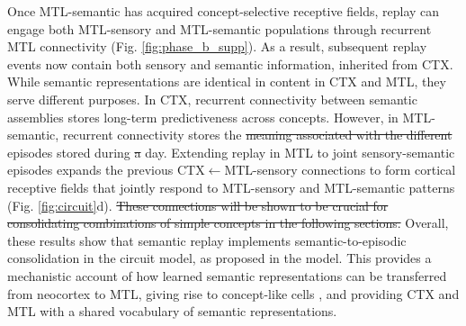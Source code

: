 \documentclass{article}
\providecommand{\DIFaddtex}[1]{{\protect\color{blue}\uwave{#1}}} %
\providecommand{\DIFdeltex}[1]{{\protect\color{red}\sout{#1}}}                      %
\providecommand{\DIFaddbegin}{} %
\providecommand{\DIFaddend}{} %
\providecommand{\DIFdelbegin}{} %
\providecommand{\DIFdelend}{} %
\providecommand{\DIFadd}[1]{\texorpdfstring{\DIFaddtex{#1}}{#1}} %
\providecommand{\DIFdel}[1]{\texorpdfstring{\DIFdeltex{#1}}{}} %
\begin{document}
Once MTL-semantic has acquired concept-selective receptive fields, replay can engage both MTL-sensory and MTL-semantic populations through recurrent MTL connectivity (Fig. \ref{fig:phase_b_supp}). As a result, subsequent replay events now contain both sensory and semantic information, inherited from CTX. While semantic representations are identical in content in CTX and MTL, they serve different purposes. In CTX, recurrent connectivity between semantic assemblies stores long-term predictiveness across concepts. However, in MTL-semantic, recurrent connectivity stores the \DIFdelbegin \DIFdel{meaning associated with the different }\DIFdelend \DIFaddbegin \DIFadd{semantic associations of the }\DIFaddend episodes stored during \DIFdelbegin \DIFdel{a }\DIFdelend \DIFaddbegin \DIFadd{the }\DIFaddend day. Extending replay in MTL to joint sensory-semantic episodes expands the previous CTX$\leftarrow$MTL-sensory connections to form cortical receptive fields that jointly respond to MTL-sensory and MTL-semantic patterns (Fig. \ref{fig:circuit}d).
\DIFdelbegin \DIFdel{These connections will be shown to be crucial for consolidating combinations of simple concepts in the following sections.
}\DIFdelend \newline\newline
Overall, these results show that semantic replay implements semantic-to-episodic consolidation in the circuit model, as proposed in the model. This provides a mechanistic account of how learned semantic representations can be transferred from neocortex to MTL, giving rise to concept-like cells \DIFdelbegin %
\DIFdelend \DIFaddbegin {}\DIFaddend , and providing CTX and MTL with a shared vocabulary of semantic representations.
\end{document}
